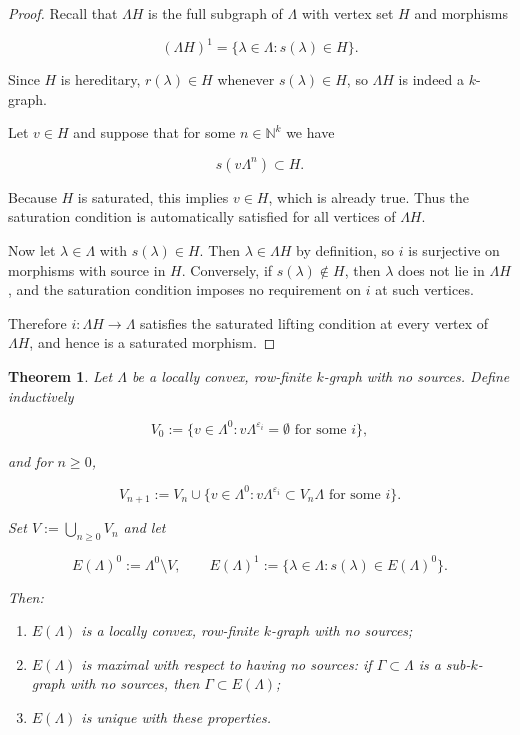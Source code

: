 \documentclass[12pt]{amsart}
\theoremstyle{plain}
\newtheorem{theorem}{Theorem}[section]
\theoremstyle{definition}
\theoremstyle{remark}
\begin{document}
\begin{proof}
Recall that $\Lambda H$ is the full subgraph of $\Lambda$ with vertex set $H$
and morphisms


\[
(\Lambda H)^1 = \{\lambda\in\Lambda : s(\lambda)\in H\}.
\]


\noindent
Since $H$ is hereditary, $r(\lambda)\in H$ whenever $s(\lambda)\in H$, so
$\Lambda H$ is indeed a $k$-graph.

Let $v\in H$ and suppose that for some $n\in\mathbb{N}^k$ we have


\[
s(v\Lambda^n)\subset H.
\]


Because $H$ is saturated, this implies $v\in H$, which is already true.
Thus the saturation condition is automatically satisfied for all
vertices of $\Lambda H$.

Now let $\lambda\in\Lambda$ with $s(\lambda)\in H$. Then $\lambda\in\Lambda H$
by definition, so $i$ is surjective on morphisms with source in $H$.
Conversely, if $s(\lambda)\notin H$, then $\lambda$ does not lie in
$\Lambda H$, and the saturation condition imposes no requirement on $i$
at such vertices.

Therefore $i:\Lambda H\to\Lambda$ satisfies the saturated lifting
condition at every vertex of $\Lambda H$, and hence is a saturated
morphism.
\end{proof}

\begin{theorem}\label{thm:essential-subgraph}
Let $\Lambda$ be a locally convex, row-finite $k$-graph with no sources.
Define inductively


\[
V_0 := \{ v\in\Lambda^0 : v\Lambda^{\varepsilon_i} = \emptyset \text{ for some } i\},
\]


and for $n\geq 0$,


\[
V_{n+1} := V_n \cup \{ v\in\Lambda^0 : v\Lambda^{\varepsilon_i} \subset V_n\Lambda \text{ for some } i\}.
\]


Set $V := \bigcup_{n\geq 0} V_n$ and let


\[
E(\Lambda)^0 := \Lambda^0\setminus V,\qquad
E(\Lambda)^1 := \{ \lambda\in\Lambda : s(\lambda)\in E(\Lambda)^0\}.
\]


Then:
\begin{enumerate}
\item $E(\Lambda)$ is a locally convex, row-finite $k$-graph with no sources;
\item $E(\Lambda)$ is maximal with respect to having no sources: if $\Gamma\subset\Lambda$
      is a sub-$k$-graph with no sources, then $\Gamma\subset E(\Lambda)$;
\item $E(\Lambda)$ is unique with these properties.
\end{enumerate}
\end{theorem}
\end{document}
